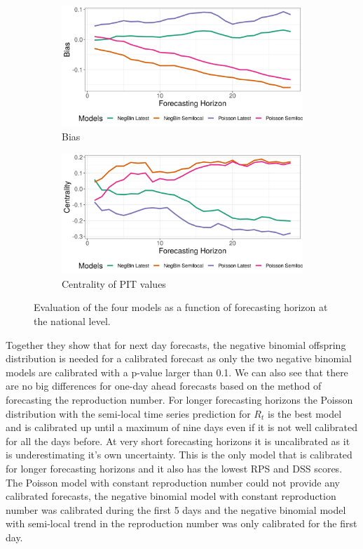 \documentclass[12pt]{article}
\begin{document}
\begin{figure}[h!]
\begin{subfigure}{0.5\textwidth}
  \centering
  \includegraphics[width=\linewidth]{../output/national_bias.png}  
  \caption{Bias}
  \label{fig:sub-third}
\end{subfigure}
\begin{subfigure}{0.5\textwidth}
  \centering
  \includegraphics[width=\linewidth]{../output/national_centrality.png}  
  \caption{Centrality of PIT values}
  \label{fig:nat_scores_4}
\end{subfigure}
  \caption{Evaluation of the four models as a function of forecasting horizon at the national level.}

  \label{fig:national_scores}
\end{figure}

Together they show that for next day forecasts, the negative binomial offspring distribution is needed for a calibrated forecast as only the two negative binomial models are calibrated with a p-value larger than 0.1. We can also see that there are no big differences for one-day ahead forecasts based on the method of forecasting the reproduction number. For longer forecasting horizons the Poisson distribution with the semi-local time series prediction for $R_t$ is the best model and is calibrated up until a maximum of nine days even if it is not well calibrated for all the days before. At very short forecasting horizons it is uncalibrated as it is underestimating it's own uncertainty. This is the only model that is calibrated for longer forecasting horizons and it also has the lowest RPS and DSS scores. The Poisson model with constant reproduction number could not provide any calibrated forecasts, the negative binomial model with constant reproduction number was calibrated during the first 5 days and the negative binomial model with semi-local trend in the reproduction number was only calibrated for the first day.
\end{document}
